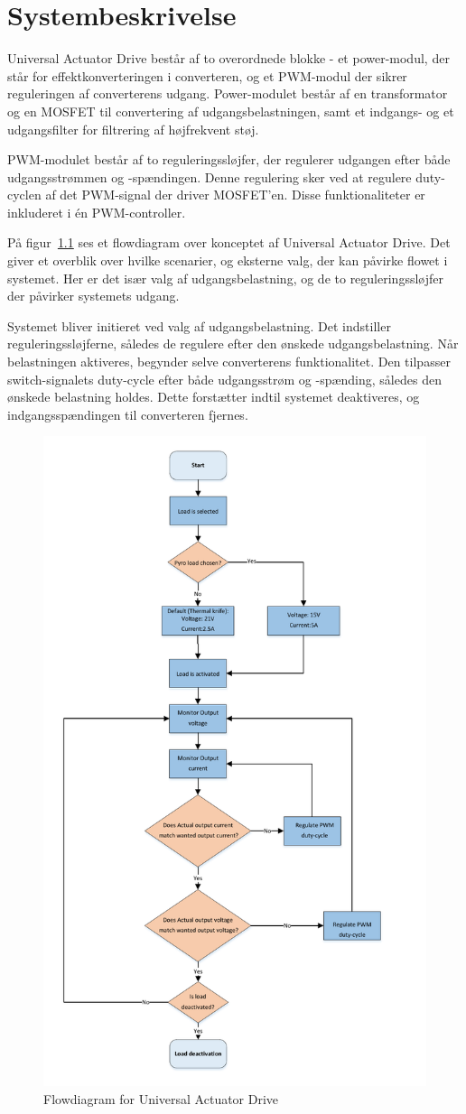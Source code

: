 
\chapter{Systembeskrivelse}
Universal Actuator Drive består af to overordnede blokke - et power-modul, der står for effektkonverteringen i converteren, og et PWM-modul der sikrer reguleringen af converterens udgang. Power-modulet består af en transformator og en MOSFET til convertering af udgangsbelastningen, samt et indgangs- og et udgangsfilter for filtrering af højfrekvent støj.

PWM-modulet består af to reguleringssløjfer, der regulerer udgangen efter både udgangsstrømmen og -spændingen. Denne regulering sker ved at regulere duty-cyclen af det PWM-signal der driver MOSFET'en. Disse funktionaliteter er inkluderet i én PWM-controller. 

På figur~\ref{fig:flowdiagram} ses et flowdiagram over konceptet af Universal Actuator Drive. Det giver et overblik over hvilke scenarier, og eksterne valg, der kan påvirke flowet i systemet. Her er det især valg af udgangsbelastning, og de to reguleringssløjfer der påvirker systemets udgang.

Systemet bliver initieret ved valg af udgangsbelastning. Det indstiller reguleringssløjferne, således de regulere efter den ønskede udgangsbelastning. Når belastningen aktiveres, begynder selve converterens funktionalitet. Den tilpasser switch-signalets duty-cycle efter både udgangsstrøm og -spænding, således den ønskede belastning holdes. Dette forstætter indtil systemet deaktiveres, og indgangsspændingen til converteren fjernes. 

\begin{figure}[H]
	\centering
	\includegraphics[width=0.7\linewidth]{../Dokumentation/tex/kravspecifikation/billeder/Flow_diagram.pdf}
	\caption{Flowdiagram for Universal Actuator Drive}
	\label{fig:flowdiagram}
\end{figure}